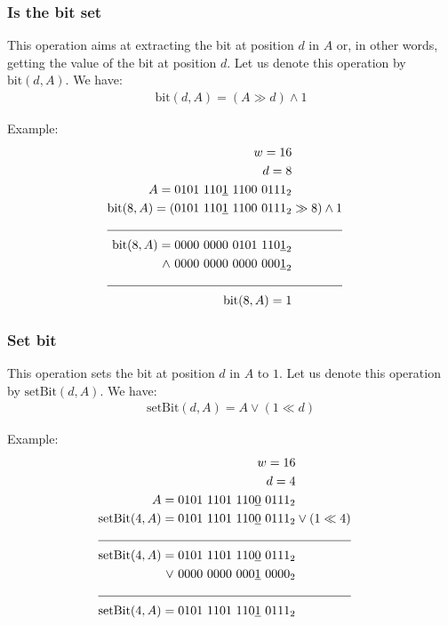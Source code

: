 \subsubsection{Is the bit set}

This operation aims at extracting the bit at position $d$ in $A$ or, in other words, getting the value of the bit at position $d$. Let us denote this operation by $\text{bit}(d, A)$. We have:
\begin{align*}
    \text{bit}(d, A) = (A \gg d) \wedge 1
\end{align*}

Example:
\begin{align*}
    w = 16\\
    d = 8\\
    A = 0101\ 110\underline{1}\ 1100\ 0111_2& \\
    \text{bit}(8,A) = (0101\ 110\underline{1}\ 1100\ 0111_2& \gg 8) \wedge 1 \\
    \cline{1-2}
    \text{bit}(8,A) = 0000\ 0000\ 0101\ 110\underline{1}_2& \\
    \wedge\ 0000\ 0000\ 0000\ 000\underline{1}_2 \\
    \cline{1-2}
    \text{bit}(8,A) = 1 &
\end{align*}

\subsubsection{Set bit}
This operation sets the bit at position $d$ in $A$ to $1$. Let us denote this operation by $\text{setBit}(d, A)$. We have:
\begin{align*}
    \text{setBit}(d, A) = A \vee (1 \ll d)
\end{align*}

Example:
\begin{align*}
    w = 16\\
    d = 4\\
    A = 0101\ 1101\ 110\underline{0}\ 0111_2& \\
    \text{setBit}(4,A) = 0101\ 1101\ 110\underline{0}\ 0111_2& \vee (1 \ll 4) \\
    \cline{1-2}
    \text{setBit}(4,A) = 0101\ 1101\ 110\underline{0}\ 0111_2& \\
    \vee\  0000\ 0000\ 000\underline{1}\ 0000_2& \\
    \cline{1-2}
    \text{setBit}(4,A) = 0101\ 1101\ 110\underline{1}\ 0111_2&
\end{align*}

